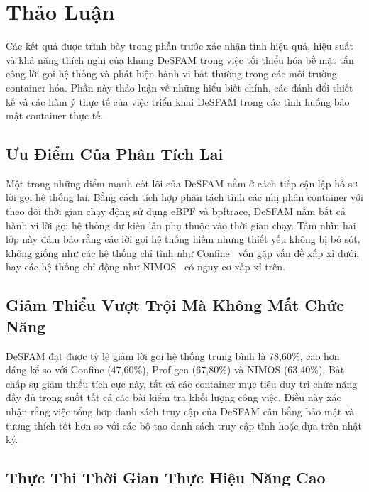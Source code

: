 \section{Thảo Luận}
\label{sec:discussion}

Các kết quả được trình bày trong phần trước xác nhận tính hiệu quả, hiệu suất và khả năng thích
nghi của khung DeSFAM trong việc tối thiểu hóa bề mặt tấn công lời gọi hệ thống và phát hiện
hành vi bất thường trong các môi trường container hóa. Phần này thảo luận về những hiểu biết
chính, các đánh đổi thiết kế và các hàm ý thực tế của việc triển khai DeSFAM trong các tình
huống bảo mật container thực tế.

\subsection{Ưu Điểm Của Phân Tích Lai}
\label{subsec:hybrid_advantage}

Một trong những điểm mạnh cốt lõi của DeSFAM nằm ở cách tiếp cận lập hồ sơ lời gọi hệ thống
lai. Bằng cách tích hợp phân tách tĩnh các nhị phân container với theo dõi thời gian chạy động
sử dụng eBPF và bpftrace, DeSFAM nắm bắt cả hành vi lời gọi hệ thống dự kiến lẫn phụ thuộc
vào thời gian chạy. Tầm nhìn hai lớp này đảm bảo rằng các lời gọi hệ thống hiếm nhưng thiết yếu
không bị bỏ sót, không giống như các hệ thống chỉ tĩnh như Confine~\cite{ref31_confine} vốn
gặp vấn đề xấp xỉ dưới, hay các hệ thống chỉ động như NIMOS~\cite{ref38_nimos} có nguy cơ
xấp xỉ trên.

\subsection{Giảm Thiểu Vượt Trội Mà Không Mất Chức Năng}
\label{subsec:reduction_advantage}

DeSFAM đạt được tỷ lệ giảm lời gọi hệ thống trung bình là 78,60\%, cao hơn đáng kể so với
Confine (47,60\%), Prof-gen (67,80\%) và NIMOS (63,40\%). Bất chấp sự giảm thiểu tích cực này,
tất cả các container mục tiêu duy trì chức năng đầy đủ trong suốt tất cả các bài kiểm tra khối
lượng công việc. Điều này xác nhận rằng việc tổng hợp danh sách truy cập của DeSFAM cân bằng
bảo mật và tương thích tốt hơn so với các bộ tạo danh sách truy cập tĩnh hoặc dựa trên nhật ký.

\subsection{Thực Thi Thời Gian Thực Hiệu Năng Cao}
\label{subsec:performance_advantage}

